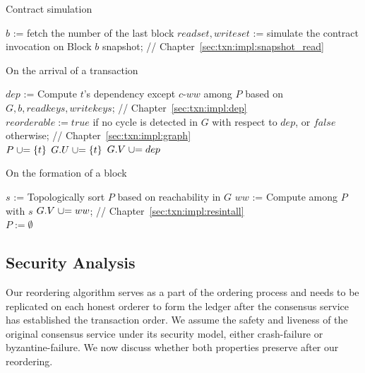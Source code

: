 \begin{algorithm}
  \caption{Contract simulation}
  \label{alg:txn:simulation}
  $b$ := fetch the number of the last block\;
  $readset, writeset$ := simulate the contract invocation on Block $b$
  snapshot; \hfill {// Chapter~\ref{sec:txn:impl:snapshot_read}}
\end{algorithm}


\begin{algorithm}[tp]
  \caption{On the arrival of a transaction}
  \label{alg:txn:txn}
  $dep$ := Compute $t$'s dependency except $c$-$ww$ among $P$ based on $G, b, readkeys,
  writekeys$; \hfill {// Chapter~\ref{sec:txn:impl:dep}}\\
  $reorderable := true$ if no cycle is detected in $G$ with respect to $dep$,
  or $false$ otherwise;
  \hfill {// Chapter~\ref{sec:txn:impl:graph}}\\
   {
    $P \mathrel{{\cup}{=}} \{t\}$\;
    $G.U \mathrel{{\cup}{=}} \{t\}$\;
    $G.V \mathrel{{\cup}{=}} dep$\;
  }
\end{algorithm}

\begin{algorithm}
  \caption{On the formation of a block}
  \label{alg:txn:blk}
  $s$ := Topologically sort $P$ based on reachability in $G$\;
  $ww$ := Compute  among $P$ with $s$\;
  $G.V \mathrel{{\cup}{=}} ww$;  \hfill {// Chapter~\ref{sec:txn:impl:resintall}} \\
  $P := \emptyset$
\end{algorithm}

\subsection{Security Analysis}
\label{sec:txn:securityanalysis}
Our reordering algorithm serves as a part of the ordering process and needs to be replicated on each honest orderer to form the ledger after the consensus service has established the transaction order. 
%
We assume the safety and liveness of the original consensus service under its security model, either crash-failure or byzantine-failure.
%
We now discuss whether both properties preserve after our reordering. 

